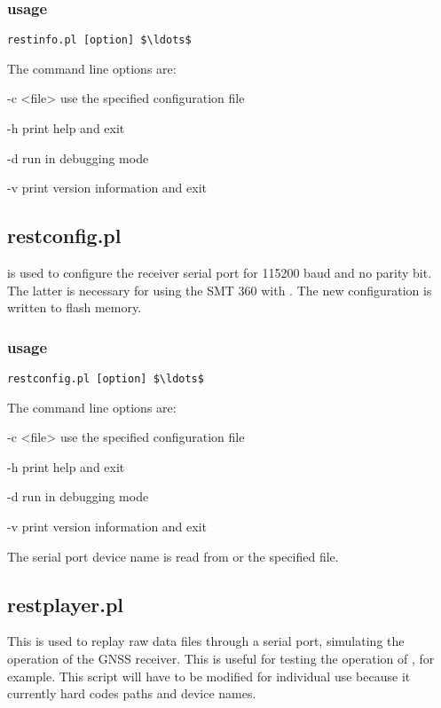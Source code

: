 \subsubsection{usage}

\begin{lstlisting}[mathescape=true]
restinfo.pl [option] $\ldots$ 
\end{lstlisting}

The command line options are:
\begin{description*}
	\item[-c \textless{file}\textgreater] use the specified configuration file
	\item[-h] print help and exit
	\item[-d] run in debugging mode
	\item[-v] print version information and exit
\end{description*}

\subsection{restconfig.pl} \hypertarget{h:restconfig}{}

 is used to configure the receiver serial port for 115200 baud and no parity bit.
The latter is necessary for using the SMT 360 with .
The new configuration is written to flash memory.

\subsubsection{usage}

\begin{lstlisting}[mathescape=true]
restconfig.pl [option] $\ldots$ 
\end{lstlisting}

The command line options are:
\begin{description*}
	\item[-c \textless{file}\textgreater] use the specified configuration file
	\item[-h] print help and exit
	\item[-d] run in debugging mode
	\item[-v] print version information and exit
\end{description*}

The serial port device name is read from  or the specified file. 

\subsection{restplayer.pl} \hypertarget{h:restplayer}{}

This is used to replay raw data files through a serial port, simulating the 
operation of the GNSS receiver. This is useful for testing the operation of 
, for example. This script will have to be modified for individual 
use because it currently hard codes paths and device names. 
